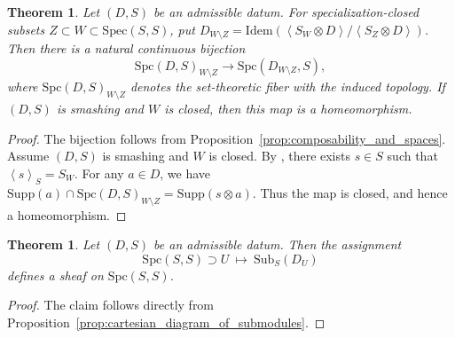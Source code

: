 \documentclass[11pt]{amsart}
\theoremstyle{definition}
\theoremstyle{plain}
\newtheorem{thm}[defn]{Theorem}
\theoremstyle{remark}
\newcommand{\Idem}{\mathrm{Idem}}
\newcommand{\Spec}{\mathrm{Spec}}
\newcommand{\Sub}{\mathrm{Sub}}
\newcommand{\Supp}{\mathrm{Supp}}
\newcommand{\ang}[1]{{\left\langle{#1}\right\rangle}}
\newcommand{\Spc}{\mathrm{Spc}}
\numberwithin{equation}{section}
\begin{document}
\begin{thm}\label{thm:local_decomposition}
Let \((D,S)\) be an admissible datum.
For specialization-closed subsets \(Z\subset W\subset \Spec(S,S)\), put \(D_{W\setminus Z}=\Idem(\ang{S_W\otimes D}/\ang{S_Z \otimes D})\).
Then there is a natural continuous bijection
\[
\Spc(D,S)_{W\setminus Z}\to \Spc(D_{W\setminus Z},S),
\]
where \(\Spc(D,S)_{W\setminus Z}\) denotes the set-theoretic fiber with the induced topology.
If \((D,S)\) is smashing and \(W\) is closed, then this map is a homeomorphism.
\end{thm}
\begin{proof}
The bijection follows from Proposition~\ref{prop:composability_and_spaces}.
Assume \((D,S)\) is smashing and \(W\) is closed.
By \cite[Proposition~2.14]{Ba}, there exists \(s\in S\) such that \(\ang{s}_S=S_W\).
For any \(a\in D\), we have
\(\Supp(a)\cap \Spc(D,S)_{W\setminus Z}=\Supp(s\otimes a)\).
Thus the map is closed, and hence a homeomorphism.
\end{proof}

\begin{thm}
Let \((D,S)\) be an admissible datum.  
Then the assignment
\[
\Spc(S,S)\supset U\ \longmapsto\ \Sub_S(D_U)
\]
defines a sheaf on \(\Spc(S,S)\).
\end{thm}

\begin{proof}
The claim follows directly from Proposition~\ref{prop:cartesian_diagram_of_submodules}.
\end{proof}
\end{document}

